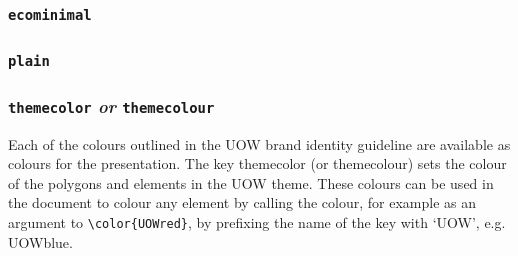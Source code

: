 \documentclass[a4paper,oneside,12pt]{article}
\newcommand{\key}[1]{\texttt{\color{UOWorange}#1}}
\newcommand{\val}[1]{\texttt{\color{UOWblue}#1}}
\newcommand{\command}[1]{\texttt{\color{UOWdarkgreen}#1}}
\begin{document}
\subsubsection*{\val{ecominimal}}%
\par

\subsubsection*{\val{plain}}%
\par


\subsubsection*{\key{themecolor} \textit{or} \key{themecolour}}
Each of the colours outlined in the UOW brand identity guideline are available as colours for the presentation. The key themecolor (or themecolour) sets the colour of the polygons and elements in the UOW theme. These colours can be used in the document to colour any element by calling the colour, for example as an argument to \command{\textbackslash{}color\{UOWred\}}, by prefixing the name of the key with `UOW', e.g. UOWblue.
\end{document}
